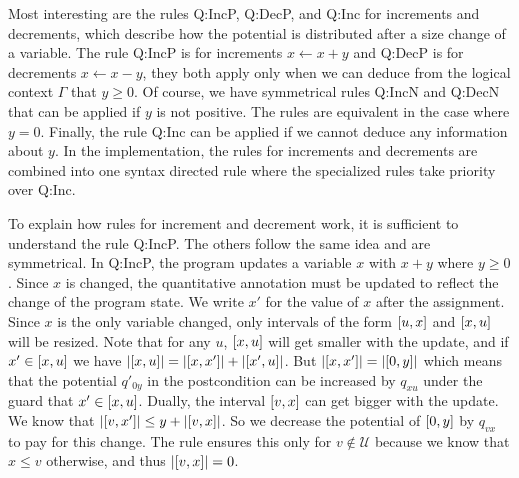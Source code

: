 \documentclass[nocopyrightspace,preprint]{sigplanconf}
\begin{document}
Most interesting are the rules {\sc Q:IncP}, {\sc Q:DecP}, and {\sc
  Q:Inc} for increments and decrements, which describe how the
potential is distributed after a size change of a variable.  The rule
{\sc Q:IncP} is for increments $x \gets x + y$ and {\sc Q:DecP} is
for decrements $x \gets x - y$, they both apply only when we can deduce
from the logical context $\Gamma$ that $y \ge 0$.
Of course, we have symmetrical rules {\sc
  Q:IncN} and {\sc Q:DecN} that can be applied if $y$ is not positive.
The rules are equivalent in the case where $y=0$.  Finally, the rule
{\sc Q:Inc} can be applied if we cannot deduce any information about
$y$.  In the implementation, the rules for increments and decrements
are combined into one syntax directed rule where the specialized rules
take priority over {\sc Q:Inc}.

To explain how rules for increment and decrement work, it is
sufficient to understand the rule {\sc Q:IncP}.  The others follow the
same idea and are symmetrical.  In {\sc Q:IncP}, the program updates a
variable $x$ with $x+y$ where $y \ge 0$.  Since $x$ is changed, the
quantitative annotation must be updated to reflect the change of the
program state.  We write $x'$ for the value of $x$ after the assignment.
Since $x$ is the only variable changed, only intervals of the form
$[u,x]$ and $[x,u]$ will be resized.  Note that for any $u$,
$[x,u]$ will get smaller with the update, and if $x' \in [x,u]$ we have $|[x,u]| = |[x,x']| + |[x',u]|$.  But
$|[x,x']| = |[0,y]|$ which means that the potential
$q'_{0y}$ in the postcondition can be increased by $q_{xu}$ under the
guard that $x' \in [x,u]$.  Dually, the interval $[v,x]$ can
get bigger with the update.  We know that $|[v,x']| \le y +
|[v,x]|$.  So we decrease the potential of $[0,y]$ by
$q_{vx}$ to pay for this change.  The rule ensures this
only for $v \not\in \mathcal U$ because we know that $x \le v$
otherwise, and thus $|[v,x]| = 0$.
\end{document}
